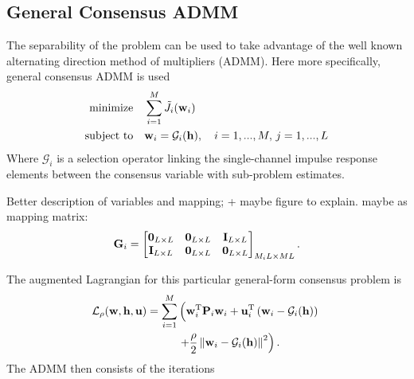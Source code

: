 \documentclass{article}
\newcommand{\h}{\mtxb{h}}
\newcommand{\w}{\mtxb{w}}
\newcommand{\uu}{\mtxb{u}}
\newcommand{\aRho}{\mtxb{P}}
\begin{document}
\subsection{General Consensus ADMM}
\label{ssec:general_consensus_admm}
The separability of the problem can be used to take advantage of the well known alternating direction method of multipliers (ADMM).
Here more specifically, general consensus ADMM \cite{} is used 
\begin{align}
    \operatorname{minimize} \quad &\sum_{i=1}^{M} \tilde{J}_i(\w_i)\\
    \text{subject to} \quad &\w_i = \mathcal{G}_i(\h),\quad i=1,...,M,\, j=1,...,L
\end{align}
Where \(\mathcal{G}_i\) is a selection operator linking the single-channel impulse response elements between the consensus variable with sub-problem estimates.
\begin{note}
    Better description of variables and mapping; + maybe figure to explain.
    maybe as mapping matrix:
    \begin{equation}
        \bm{\mathrm{G}}_i = \begin{bmatrix}
            \bm{0}_{L \times L} & \bm{0}_{L \times L} & \bm{\mathrm{I}}_{L \times L}\\
            \bm{\mathrm{I}}_{L \times L} & \bm{0}_{L \times L} & \bm{0}_{L \times L}\\
        \end{bmatrix}_{M_i L \times M L}.
    \end{equation}
\end{note}
The augmented Lagrangian for this particular general-form consensus problem is
\begin{align}
    \mathcal{L}_{\rho} (\w,\h,\uu) = \sum_{i=1}^M &\left( \w_i^\T \aRho_i \w_i + \uu_i^{\T} \left(\w_i - \mathcal{G}_i(\h)\right) \vphantom{+ \frac{\rho}{2} \left\| \w_i - \mathcal{G}_i(\h) \right\|^2} \right.\nonumber\\
    &\left.+ \frac{\rho}{2} \left\| \w_i - \mathcal{G}_i(\h) \right\|^2 \right).\label{eq:general_consensus_admm:lagrangian}
\end{align}
The ADMM then consists of the iterations
\end{document}
